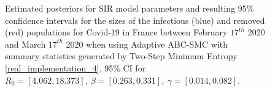 \documentclass[11pt,a4paper]{article}
\theoremstyle{break}
\begin{document}
  \begin{figure}[H]
    \centering
    \caption{Estimated posteriors for SIR model parameters and resulting 95\% confidence intervals for the sizes of the infectious (blue) and removed (red) populations for Covid-19 in France between February $17^{th}$ 2020 and March $17^{th}$ 2020 when using Adaptive ABC-SMC with summary statistics generated by Two-Step Minimum Entropy \ref{real_implementation_4}. 95\% CI for $R_0=[4.062,18.373],\ \beta=[0.263,0.331],\ \gamma=[0.014,0.082]$.}
    \label{fig_france_2_me}
  \end{figure}
\end{document}
